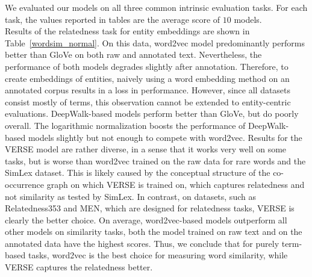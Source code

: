 We evaluated our models on all three common intrinsic evaluation tasks. For each task, the values reported in tables are the average score of $10$ models. \\
Results of the relatedness task for entity embeddings are shown in Table~\ref{wordsim_normal}. On this data, word2vec model predominantly performs better than GloVe on both raw and annotated text. Nevertheless, the performance of both models degrades slightly after annotation. 
Therefore, to create embeddings of entities, naively using a word embedding method on an annotated corpus results in a loss in performance. However, since all datasets consist mostly of terms, this observation cannot be extended to entity-centric evaluations. DeepWalk-based models perform better than GloVe, but do poorly overall. The logarithmic normalization boosts the performance of DeepWalk-based models slightly but not enough to compete with word2vec. Results for the VERSE model are rather diverse, in a sense that it works very well on some tasks, but is worse than word2vec trained on the raw data for rare words and the SimLex dataset. This is likely caused by the conceptual structure of the co-occurrence graph on which VERSE is trained on, which captures relatedness and not similarity as tested by SimLex. In contrast, on datasets, such as Relatedness353 and MEN, which are designed for relatedness tasks, VERSE is clearly the better choice. On average, word2vec-based models outperform all other models on similarity tasks, both the model trained on raw text and on the annotated data have the highest scores. Thus, we conclude that for purely term-based tasks, word2vec is the best choice for measuring word similarity, while VERSE captures the relatedness better. 


